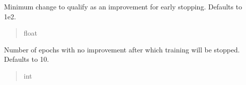 \documentclass[letterpaper,10pt,english]{sphinxmanual}
\begin{document}
\begin{fulllineitems}
\begin{fulllineitems}
\label{\detokenize{application.algorithms.dae:application.algorithms.dae.DaeConfiguration.DaeConfiguration.early_stopping_delta}}
\pysigstartsignatures
{}
\pysigstopsignatures
\sphinxAtStartPar
Minimum change to qualify as an improvement for early stopping. Defaults to 1e\sphinxhyphen{}2.
\begin{quote}\begin{description}
\sphinxAtStartPar
float

\end{description}\end{quote}

\end{fulllineitems}


\begin{fulllineitems}
\label{\detokenize{application.algorithms.dae:application.algorithms.dae.DaeConfiguration.DaeConfiguration.early_stopping_patience}}
\pysigstartsignatures
{}
\pysigstopsignatures
\sphinxAtStartPar
Number of epochs with no improvement after which training will be stopped. Defaults to 10.
\begin{quote}\begin{description}
\sphinxAtStartPar
int

\end{description}\end{quote}

\end{fulllineitems}


\begin{fulllineitems}
\label{\detokenize{application.algorithms.dae:id0}}
\pysigstartsignatures
{}
\pysigstopsignatures
\end{fulllineitems}


\end{fulllineitems}
\end{document}
